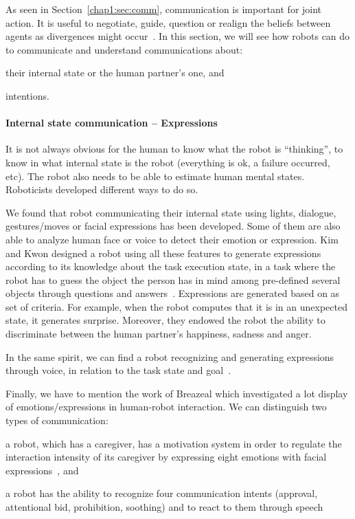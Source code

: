 \documentclass[a4paper,11pt,twoside]{StyleThese}
\begin{document}
As seen in Section~\ref{chap1:sec:comm}, communication is important for joint action. It is useful to negotiate, guide, question or realign the beliefs between agents as divergences might occur~\cite{cohen_1991_teamwork}. In this section, we will see how robots can do to communicate and understand communications about: 
\begin{inlineEnumerate}
	\item their internal state or the human partner's one, and
	\item intentions.
\end{inlineEnumerate}

\paragraph{Internal state communication -- Expressions}
It is not always obvious for the human to know what the robot is ``thinking'', \ie to know in what internal state is the robot (\eg everything is ok, a failure occurred, etc). The robot also needs to be able to estimate human mental states. Roboticists developed different ways to do so. 

We found that robot communicating their internal state using lights, dialogue, gestures/moves or facial expressions has been developed. Some of them are also able to analyze human face or voice to detect their emotion or expression. Kim and Kwon designed a robot using all these features to generate expressions according to its knowledge about the task execution state, in a task where the robot has to guess the object the person has in mind among pre-defined several objects through questions and answers~\cite{kim_2010_computational}. Expressions are generated based on as set of criteria. For example, when the robot computes that it is in an unexpected state, it generates surprise. Moreover, they endowed the robot the ability to discriminate between the human partner's happiness, sadness and anger. 

In the same spirit, we can find a robot recognizing and generating expressions through voice, in relation to the task state and goal~\cite{scheutz_2006_utility}. 

Finally, we have to mention the work of Breazeal which investigated a lot display of emotions/expressions in human-robot interaction. We can distinguish two types of communication:
\begin{inlineEnumerate}
	\item a robot, which has a caregiver, has a motivation system in order to regulate the interaction intensity of its caregiver by expressing eight emotions with facial expressions~\cite{breazeal_1998_motivational, breazeal_2004_function}, and
	\item a robot has the ability to recognize four communication intents (approval, attentional bid, prohibition, soothing) and to react to them through speech~\cite{breazeal_2002_regulation, breazeal_2003_emotion}
\end{inlineEnumerate}
\end{document}
